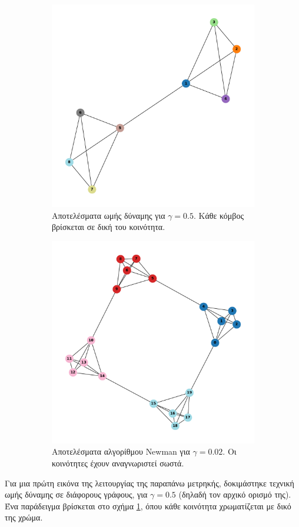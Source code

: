 \documentclass[12pt, letterpaper]{article}
\begin{document}
\begin{figure}
  \begin{subfigure}{0.5\textwidth}
    \centering 
    \includegraphics[width=0.5\linewidth]{quad_comm_gamma=0.5.pdf}
    \caption{Αποτελέσματα ωμής δύναμης για $\gamma = 0.5$. Κάθε κόμβος βρίσκεται σε δική του κοινότητα.}
    \label{fig:graph8comm}
  \end{subfigure}
  \begin{subfigure}{0.5\textwidth}
    \centering 
    \includegraphics[width=0.7\linewidth]{cluster_4,5gamma=0.02,newman.pdf}
    \caption{Αποτελέσματα αλγορίθμου \textlatin{Newman} για $\gamma = 0.02$. Οι κοινότητες έχουν αναγνωριστεί σωστά.}
    \label{fig:newman4,5}
  \end{subfigure}
  \caption{}
  \label{}
\end{figure}



Για μια πρώτη εικόνα της λειτουργίας της παραπάνω μετρηκής, δοκιμάστηκε τεχνική ωμής δύναμης σε διάφορους γράφους,
για $\gamma = 0.5$ (δηλαδή τον αρχικό ορισμό της).
Ένα παράδειγμα βρίσκεται στο σχήμα \ref{fig:graph8comm}, όπου κάθε κοινότητα χρωματίζεται με δικό της χρώμα. 
\end{document}
